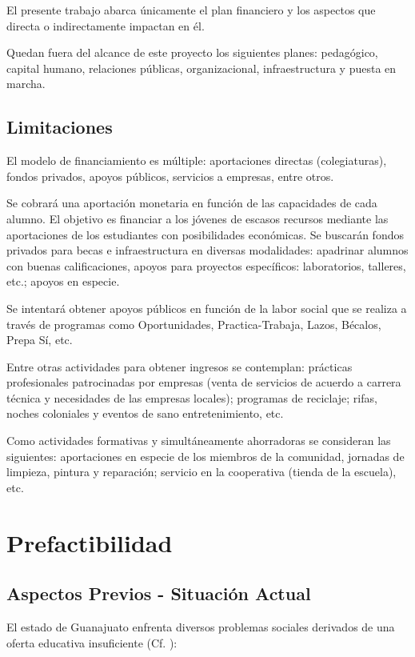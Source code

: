 El presente trabajo abarca únicamente el plan financiero y los aspectos que directa o indirectamente impactan en él.

Quedan fuera del alcance de este proyecto los siguientes planes: pedagógico, capital humano, relaciones públicas, organizacional, infraestructura y puesta en marcha.

\subsection{Limitaciones}

El modelo de financiamiento es múltiple: aportaciones directas (colegiaturas), fondos privados, apoyos públicos, servicios a empresas, entre otros.

Se cobrará una aportación monetaria en función de las capacidades de cada alumno. El objetivo es financiar a los jóvenes de escasos recursos mediante las aportaciones de los estudiantes con posibilidades económicas.
Se buscarán fondos privados para becas e infraestructura en diversas modalidades: apadrinar alumnos con buenas calificaciones, apoyos para proyectos específicos: laboratorios, talleres, etc.; apoyos en especie.

Se intentará obtener apoyos públicos en función de la labor social que se realiza a través de programas como Oportunidades, Practica-Trabaja, Lazos, Bécalos, Prepa Sí, etc.

Entre otras actividades para obtener ingresos se contemplan: prácticas profesionales patrocinadas por empresas (venta de servicios de acuerdo a carrera técnica y necesidades de las empresas locales); programas de reciclaje; rifas, noches coloniales y eventos de sano entretenimiento, etc.

Como actividades formativas y simultáneamente ahorradoras se consideran las siguientes: aportaciones en especie de los miembros de la comunidad, jornadas de limpieza, pintura y reparación; servicio en la cooperativa (tienda de la escuela), etc.

\section{Prefactibilidad}

\subsection{Aspectos Previos - Situación Actual}
\label{sub:Intro:AspectosPrevios}

El estado de Guanajuato enfrenta diversos problemas sociales derivados de una oferta educativa insuficiente
(Cf. \citep{Morales09}):

